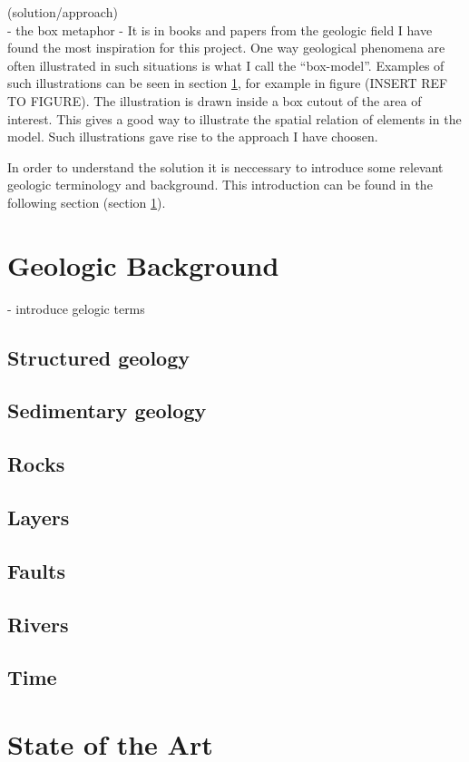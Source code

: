 \documentclass[a4paper,10pt]{article}
\begin{document}
(solution/approach)\\
	- the box metaphor
	- 
It is in books and papers from the geologic field I have found the most inspiration for this project. One way geological phenomena are often illustrated in such situations is what I call the ``box-model''. Examples of such illustrations can be seen in section \ref{sec:geology}, for example in figure (INSERT REF TO FIGURE). The illustration is drawn inside a box cutout of the area of interest. This gives a good way to illustrate the spatial relation of elements in the model. Such illustrations gave rise to the approach I have choosen. 
	
In order to understand the solution it is neccessary to introduce some relevant geologic terminology and background. This introduction can be found in the following section (section \ref{sec:geology}).

\section{Geologic Background}
\label{sec:geology}
- introduce gelogic terms
\subsection{Structured geology}
\subsection{Sedimentary geology}
\subsection{Rocks}
\subsection{Layers}
\subsection{Faults}
\subsection{Rivers}
\subsection{Time}


\section{State of the Art}
\end{document}
